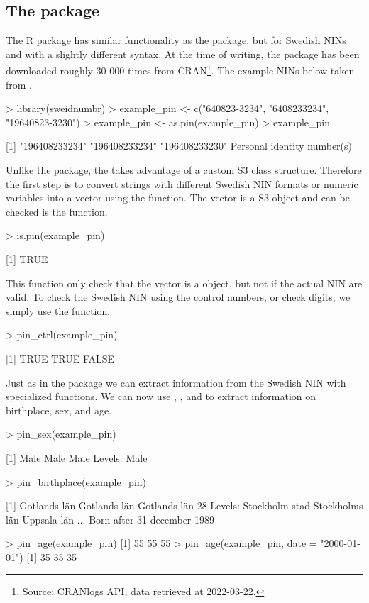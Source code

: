 \subsection{The  package}

The  R package has similar functionality as the  package, but for Swedish NINs and with a slightly different syntax. At the time of writing, the package has been downloaded roughly 30 000 times from CRAN\footnote{Source: CRANlogs API, data retrieved at 2022-03-22.}. The example NINs below taken from \citet{sv2007}.

\begin{example}
  > library(sweidnumbr)
  > example_pin <- c("640823-3234", "6408233234", "19640823-3230")
  > example_pin <- as.pin(example_pin)
  > example_pin

  [1] "196408233234" "196408233234" "196408233230"
  Personal identity number(s)
\end{example}

Unlike the  package, the  takes advantage of a custom S3 class structure. Therefore the first step is to convert strings with different Swedish NIN formats or numeric variables into a  vector using the  function. The  vector is a S3 object and can be checked is the  function.

\begin{example}
  > is.pin(example_pin)

  [1] TRUE
\end{example}

This function only check that the vector is a  object, but not if the actual NIN are valid. To check the Swedish NIN using the control numbers, or check digits, we simply use the  function.

\begin{example}
  > pin_ctrl(example_pin)

  [1]  TRUE  TRUE FALSE
\end{example}

Just as in the  package we can extract information from the Swedish NIN with specialized functions. We can now use , , and  to extract information on birthplace, sex, and age.

\begin{example}
  > pin_sex(example_pin)
   
  [1] Male Male Male
  Levels: Male

  > pin_birthplace(example_pin)
   
  [1] Gotlands län Gotlands län Gotlands län
  28 Levels: Stockholm stad Stockholms län Uppsala län ... Born after 31 december 1989

  > pin_age(example_pin)
  [1] 55 55 55
  > pin_age(example_pin, date = "2000-01-01")
  [1] 35 35 35
\end{example}

